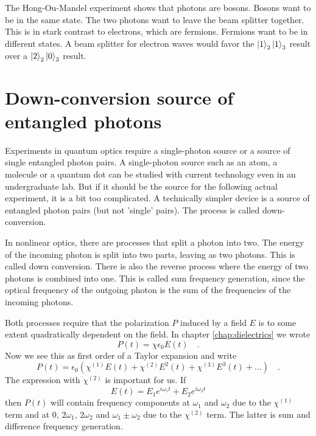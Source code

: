 The Hong-Ou-Mandel experiment shows that photons are bosons. Bosons want to be in the same state. The two photons want to leave the beam splitter together. This is in stark contrast to electrons, which are fermions. Fermions want to be in different states. A beam splitter for electron waves would favor the $\ket{1}_2\ket{1}_3$ result over a $\ket{2}_2\ket{0}_3$ result.



\section{Down-conversion source of entangled photons}

Experiments in quantum optics require a single-photon source or a source of single entangled photon pairs. A single-photon source such as an atom, a molecule or a quantum dot can be studied with current technology even in an undergraduate lab. But if it should be the source for the following actual experiment, it is a bit too complicated. A technically simpler device is a source of entangled photon pairs (but not 'single' pairs). The process is called down-conversion.

In nonlinear optics, there are processes that split a photon into two. The energy of the incoming photon is split into two parts, leaving as two photons. This is called down conversion. There is also the reverse process where the energy of two photons is combined into one. This is called sum frequency generation, since the optical frequency of the outgoing photon is the sum of the frequencies of the incoming photons.


Both processes require that the polarization $P$ induced by a field $E$ is to some extent quadratically dependent on the field. In chapter \ref{chap:dielectrics} we wrote 
\begin{equation}
    P(t) =  \chi \epsilon_0 E(t)  \quad .
\end{equation}
Now we see this as first order of a Taylor expansion and write 
\begin{equation}
    P(t) =  \epsilon_0 \left( \chi^{(1)} E(t) +  \chi^{(2)} E^2(t)   +  \chi^{(3)} E^3(t)  + \dots \right) \quad .
\end{equation}
The expression with $\chi^{(2)}$ is important for us. If 
\begin{equation}
    E(t) = E_1 e^{i \omega_1 t} + E_2 e^{i \omega_2 t}
\end{equation}
then $P(t)$ will contain frequency components at $\omega_1$ and $\omega_2$ due to the $\chi^{(1)}$ term and at 0, $2\omega_1$, $2\omega_2$ and $\omega_1 \pm \omega_2$ due to the $\chi^{(2)}$ term. The latter is sum and difference frequency generation.

